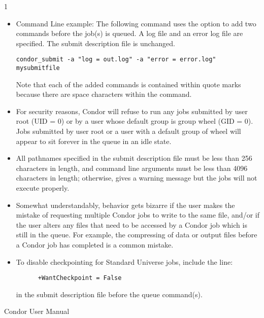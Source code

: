 \begin{ManPage}{\label{man-condor-submit}}{1}
\begin{itemize}
\begin{verbatim}
      Error   = err.$(Process)                                                
      Input   = in.$(Process)                                                 
      Output  = out.$(Process)                                                
      Log = foo.log                                                                       
                                                                          
      Queue 150
\end{verbatim}

\item{Command Line example:} The following command uses the
 option to add two commands before the job(s) is queued.
A log file and an error log file are specified.
The submit description file is unchanged.
\begin{verbatim}
condor_submit -a "log = out.log" -a "error = error.log" mysubmitfile
\end{verbatim}
Note that each of the added commands is contained within quote marks
because there are space characters within the command.
\end{itemize} 


\GenRem
\begin{itemize}

\item For security reasons, Condor will refuse to run any jobs submitted
by user root (UID = 0) or by a user whose default group is group wheel
(GID = 0). Jobs submitted by user root or a user with a default group of
wheel will appear to sit forever in the queue in an idle state. 

\item All pathnames specified in the submit description file must be
less than 256 characters in length, and command line arguments must be
less than 4096 characters in length; otherwise,  gives a
warning message but the jobs will not execute properly. 

\item Somewhat understandably, behavior gets bizarre if the user makes
the mistake of requesting multiple Condor jobs to write to the
same file, and/or if the user alters any files that need to be accessed
by a Condor job which is still in the queue.
For example, the compressing of data or
output files before a Condor job has completed is a common mistake.

\item To disable checkpointing for Standard Universe jobs, include the
line:
\begin{verbatim}
      +WantCheckpoint = False
\end{verbatim}
in the submit description file before the queue command(s).
\end{itemize}

\SeeAlso
Condor User Manual

\end{ManPage}

